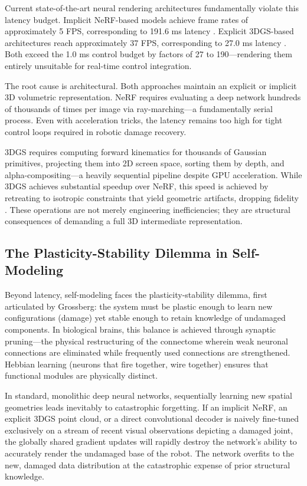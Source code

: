 ﻿\documentclass[12pt,a4paper,oneside]{report}
\begin{document}
Current state-of-the-art neural rendering architectures fundamentally violate this latency budget. Implicit NeRF-based models achieve frame rates of approximately 5 FPS, corresponding to 191.6 ms latency \cite{hu2024teaching}. Explicit 3DGS-based architectures reach approximately 37 FPS, corresponding to 27.0 ms latency \cite{hu2025learning}. Both exceed the 1.0 ms control budget by factors of 27 to 190---rendering them entirely unsuitable for real-time control integration.

The root cause is architectural. Both approaches maintain an explicit or implicit 3D volumetric representation. NeRF requires evaluating a deep network hundreds of thousands of times per image via ray-marching---a fundamentally serial process. Even with acceleration tricks, the latency remains too high for tight control loops required in robotic damage recovery.

3DGS requires computing forward kinematics for thousands of Gaussian primitives, projecting them into 2D screen space, sorting them by depth, and alpha-compositing---a heavily sequential pipeline despite GPU acceleration. While 3DGS achieves substantial speedup over NeRF, this speed is achieved by retreating to isotropic constraints that yield geometric artifacts, dropping fidelity \cite{hu2025learning}. These operations are not merely engineering inefficiencies; they are structural consequences of demanding a full 3D intermediate representation.

\subsection{The Plasticity-Stability Dilemma in Self-Modeling}

Beyond latency, self-modeling faces the plasticity-stability dilemma, first articulated by Grossberg: the system must be plastic enough to learn new configurations (damage) yet stable enough to retain knowledge of undamaged components. In biological brains, this balance is achieved through synaptic pruning---the physical restructuring of the connectome wherein weak neuronal connections are eliminated while frequently used connections are strengthened. Hebbian learning (neurons that fire together, wire together) ensures that functional modules are physically distinct.

In standard, monolithic deep neural networks, sequentially learning new spatial geometries leads inevitably to catastrophic forgetting. If an implicit NeRF, an explicit 3DGS point cloud, or a direct convolutional decoder is naively fine-tuned exclusively on a stream of recent visual observations depicting a damaged joint, the globally shared gradient updates will rapidly destroy the network's ability to accurately render the undamaged base of the robot. The network overfits to the new, damaged data distribution at the catastrophic expense of prior structural knowledge.
\end{document}

